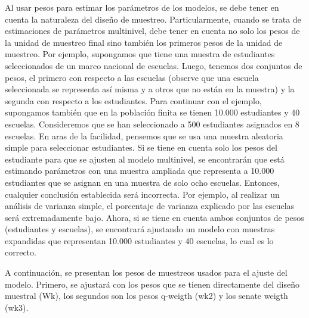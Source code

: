 \documentclass[
  spanish,
  12pt,
]{book}
\newenvironment{Shaded}{\begin{snugshade}}{\end{snugshade}}
\newcommand{\AttributeTok}[1]{\textcolor[rgb]{0.13,0.29,0.53}{#1}}
\newcommand{\FunctionTok}[1]{\textcolor[rgb]{0.13,0.29,0.53}{\textbf{#1}}}
\newcommand{\NormalTok}[1]{#1}
\newcommand{\OtherTok}[1]{\textcolor[rgb]{0.56,0.35,0.01}{#1}}
\newcommand{\SpecialCharTok}[1]{\textcolor[rgb]{0.81,0.36,0.00}{\textbf{#1}}}
\begin{document}
Al usar pesos para estimar los parámetros de los modelos, se debe tener en cuenta la naturaleza del diseño de muestreo. Particularmente, cuando se trata de estimaciones de parámetros multinivel, debe tener en cuenta no solo los pesos de la unidad de muestreo final sino también los primeros pesos de la unidad de muestreo. Por ejemplo, supongamos que tiene una muestra de estudiantes seleccionados de un marco nacional de escuelas. Luego, tenemos dos conjuntos de pesos, el primero con respecto a las escuelas (observe que una escuela seleccionada se representa así misma y a otros que no están en la muestra) y la segunda con respecto a los estudiantes. Para continuar con el ejemplo, supongamos también que en la población finita se tienen 10.000 estudiantes y 40 escuelas. Consideremos que se han seleccionado a 500 estudiantes asignados en 8 escuelas. En aras de la facilidad, pensemos que se usa una muestra aleatoria simple para seleccionar estudiantes. Si se tiene en cuenta solo los pesos del estudiante para que se ajusten al modelo multinivel, se encontrarán que está estimando parámetros con una muestra ampliada que representa a 10.000 estudiantes que se asignan en una muestra de solo ocho escuelas. Entonces, cualquier conclusión establecida será incorrecta. Por ejemplo, al realizar un análisis de varianza simple, el porcentaje de varianza explicado por las escuelas será extremadamente bajo. Ahora, si se tiene en cuenta ambos conjuntos de pesos (estudiantes y escuelas), se encontrará ajustando un modelo con muestras expandidas que representan 10.000 estudiantes y 40 escuelas, lo cual es lo correcto.

A continuación, se presentan los pesos de muestreos usados para el ajuste del modelo. Primero, se ajustará con los pesos que se tienen directamente del diseño muestral (Wk), los segundos son los pesos q-weigth (wk2) y los senate weigth (wk3).

\begin{Shaded}
\end{Shaded}
\end{document}
